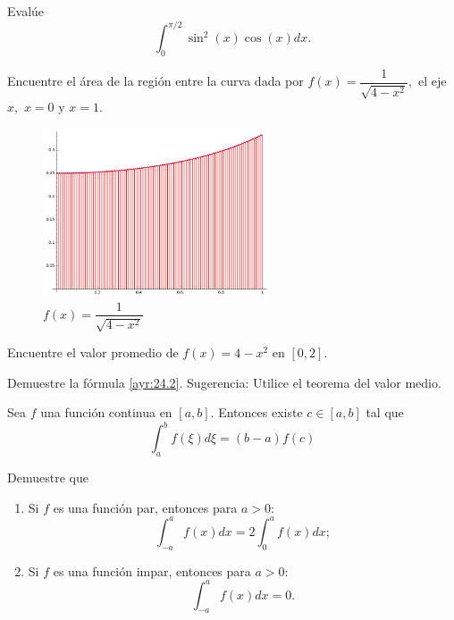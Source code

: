  \begin{resuelto}
  Evalúe $$\int_{0}^{\pi/2} \sin^{2}(x)\cos(x)dx.$$
 \end{resuelto}




 \begin{resuelto}
  Encuentre el área de la región entre la curva dada por $f(x)=\dfrac{1}{\sqrt{4-x^{2}}},$ el eje $x,$ $x=0$ y $x=1.$

 \end{resuelto}




 \begin{figure}
 \centering
 \includegraphics[height=5cm,keepaspectratio=true]{./calculo/sage0.png}
 \caption{$f(x)=\dfrac{1}{\sqrt{4-x^{2}}}$}
 \label{fig:solved:24.2}
\end{figure}




 \begin{resuelto}
  Encuentre el valor promedio de $f(x)=4-x^{2}$ en $[0,2].$
 \end{resuelto}




 \begin{resuelto}
  Demuestre la fórmula \eqref{ayr:24.2}. Sugerencia: Utilice el teorema del valor medio.
 \end{resuelto}




 \begin{teorema}
 Sea $f$ una función continua en $[a,b].$  Entonces existe $c\in[a,b]$ tal que
 \[
  \label{ayr:24.1}
  \int_{a}^{b}f(\xi)d\xi = \left( b-a \right)f(c)
 \]
\end{teorema}



 \begin{resuelto}
  Demuestre que
  \begin{enumerate}
   \item Si $f$ es una función par, entonces
   para $a>0:$
   $$
   \int_{-a}^{a}f(x)dx=2 \int_{0}^{a}f(x)dx;
   $$
   \item Si $f$ es una función impar, entonces
   para $a>0:$
   $$
   \int_{-a}^{a}f(x)dx=0.
   $$
  \end{enumerate}

 \end{resuelto}




